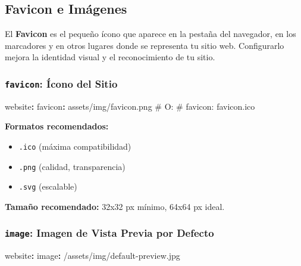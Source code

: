 \documentclass[
  doc,
  floatsintext,
  longtable,
  a4paper,
  nolmodern,
  notxfonts,
  notimes,
  12pt,
  colorlinks=true,linkcolor=blue,citecolor=blue,urlcolor=blue]{apa7}
\newenvironment{Shaded}{\begin{snugshade}}{\end{snugshade}}
\newcommand{\AttributeTok}[1]{\textcolor[rgb]{0.40,0.45,0.13}{#1}}
\newcommand{\CommentTok}[1]{\textcolor[rgb]{0.37,0.37,0.37}{#1}}
\newcommand{\FunctionTok}[1]{\textcolor[rgb]{0.28,0.35,0.67}{#1}}
\newcommand{\KeywordTok}[1]{\textcolor[rgb]{0.00,0.23,0.31}{\textbf{#1}}}
\providecommand{\tightlist}{%
  \setlength{\itemsep}{0pt}\setlength{\parskip}{0pt}}
\begin{document}
\subsection{Favicon e Imágenes}\label{favicon-e-imuxe1genes}

El \textbf{Favicon} es el pequeño ícono que aparece en la pestaña del
navegador, en los marcadores y en otros lugares donde se representa tu
sitio web. Configurarlo mejora la identidad visual y el reconocimiento
de tu sitio.

\subsubsection{\texorpdfstring{\texttt{favicon}: Ícono del
Sitio}{favicon: Ícono del Sitio}}\label{favicon-uxedcono-del-sitio}

\begin{Shaded}
\begin{Highlighting}[]
\FunctionTok{website}\KeywordTok{:}
\AttributeTok{  }\FunctionTok{favicon}\KeywordTok{:}\AttributeTok{ assets/img/favicon.png}
\CommentTok{  \# O:}
\CommentTok{  \# favicon: favicon.ico}
\end{Highlighting}
\end{Shaded}

\textbf{Formatos recomendados:}

\begin{itemize}
\tightlist
\item
  \texttt{.ico} (máxima compatibilidad)
\item
  \texttt{.png} (calidad, transparencia)
\item
  \texttt{.svg} (escalable)
\end{itemize}

\textbf{Tamaño recomendado:} 32x32 px mínimo, 64x64 px ideal.

\subsubsection{\texorpdfstring{\texttt{image}: Imagen de Vista Previa
por
Defecto}{image: Imagen de Vista Previa por Defecto}}\label{image-imagen-de-vista-previa-por-defecto}

\begin{Shaded}
\begin{Highlighting}[]
\FunctionTok{website}\KeywordTok{:}
\AttributeTok{  }\FunctionTok{image}\KeywordTok{:}\AttributeTok{ /assets/img/default{-}preview.jpg}
\end{Highlighting}
\end{Shaded}
\end{document}
